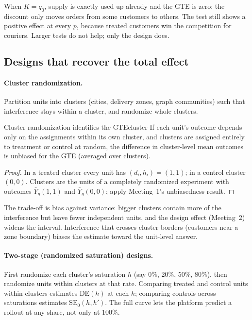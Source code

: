 \documentclass[11pt]{article}
\begin{document}
When $K = q_0$, supply is exactly used up already and the GTE is zero: the discount only moves orders from some
customers to others. The test still shows a positive effect at every $p$, because treated customers win the
competition for couriers. Larger tests do not help; only the design does.

\subsection{Designs that recover the total effect}

\paragraph{Cluster randomization.} Partition units into clusters (cities, delivery zones, graph communities) such
that interference stays within a cluster, and randomize whole clusters.

\begin{prop}{Cluster randomization identifies the GTE}{cluster}
If each unit's outcome depends only on the assignments within its own cluster, and clusters are assigned entirely to
treatment or control at random, the difference in cluster-level mean outcomes is unbiased for the GTE (averaged over
clusters).
\end{prop}
\begin{proof}
In a treated cluster every unit has $(d_i, h_i) = (1,1)$; in a control cluster $(0,0)$. Clusters are the units of a
completely randomized experiment with outcomes $\bar Y_g(1,1)$ and $\bar Y_g(0,0)$; apply Meeting~1's unbiasedness
result.
\end{proof}

The trade-off is bias against variance: bigger clusters contain more of the interference but leave fewer
independent units, and the design effect (Meeting~2) widens the interval. Interference that crosses cluster
borders (customers near a zone boundary) biases the estimate toward the unit-level answer.

\paragraph{Two-stage (randomized saturation) designs.} First randomize each cluster's saturation $h$ (say 0\%, 20\%,
50\%, 80\%), then randomize units within clusters at that rate. Comparing treated and control units within clusters
estimates $\text{DE}(h)$ at each $h$; comparing controls across saturations estimates $\text{SE}_0(h, h')$. The full curve
lets the platform predict a rollout at any share, not only at 100\%.
\end{document}
